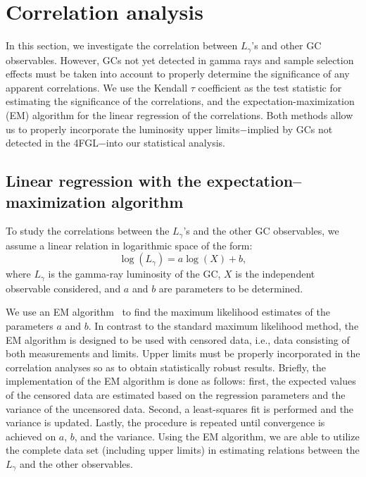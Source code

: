 \documentclass[doublespace,nopageskip]{VTthesis} %
\begin{document}
\section{Correlation analysis}\label{sec:correlation}

In this section, we investigate the correlation between $L_\gamma$'s and other GC observables. However, GCs not yet detected in gamma rays and sample selection effects must be taken into account to properly determine the significance of any apparent correlations. We use the Kendall $\tau$ coefficient as the test statistic for estimating the significance of the correlations, and the expectation-maximization (EM) algorithm for the linear regression of the correlations. Both methods allow us to properly incorporate the luminosity upper limits$-$implied by GCs not detected in the 4FGL$-$into our statistical analysis.

\subsection{Linear regression with the expectation–maximization algorithm}\label{sec:EM}

To study the correlations between the $L_\gamma$'s and the other GC observables, we assume a linear relation in logarithmic space of the form:
\begin{equation}
    \log(L_\gamma) = a\log(X)+b,
\end{equation}
where $L_\gamma$ is the gamma-ray luminosity of the GC, $X$ is the independent observable considered, and $a$ and $b$ are parameters to be determined. 

We use an EM algorithm~\citep{1985ApJ...293..192F,1986ApJ...306..490I,1992BAAS...24..839L} to find the maximum likelihood estimates of the parameters $a$ and $b$. In contrast to the standard maximum likelihood method, the EM algorithm is designed to be used with censored data, i.e., data consisting of both measurements and limits. Upper limits must be properly incorporated in the correlation analyses so as to obtain statistically robust results. Briefly, the implementation of the EM algorithm is done as follows: first, the expected values of the censored data are estimated based on the regression parameters and the variance of the uncensored data. Second, a least-squares fit is performed and the variance is updated. Lastly, the procedure is repeated until convergence is achieved on $a$, $b$, and the variance. Using the EM algorithm, we are able to utilize the complete data set (including upper limits) in estimating relations between the $L_\gamma$ and the other observables.
\end{document}
